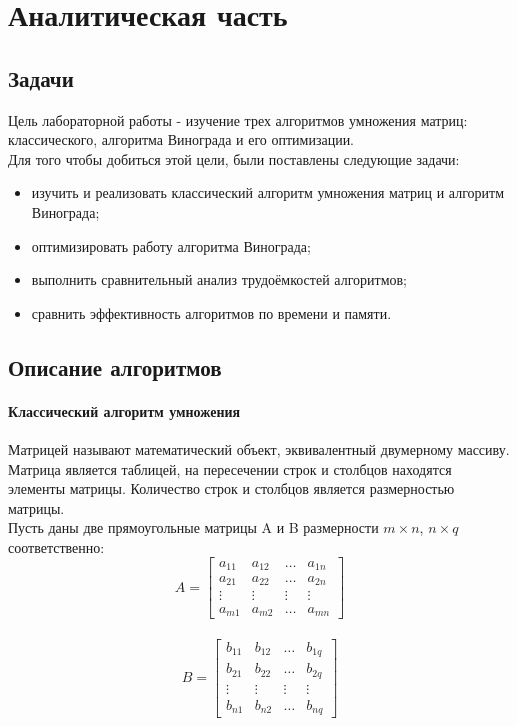 \documentclass[12pt, a4paper]{report}
\begin{document}
    \chapter{Аналитическая часть}
	\section{Задачи}
	Цель лабораторной работы - изучение трех алгоритмов умножения матриц: классического, алгоритма Винограда и его оптимизации.\\
	Для того чтобы добиться этой цели, были поставлены следующие задачи:\\
	\begin{itemize}
		\item изучить и реализовать классический алгоритм умножения матриц и алгоритм Винограда;
		\item оптимизировать работу алгоритма Винограда;
		\item выполнить сравнительный анализ трудоёмкостей алгоритмов;
		\item сравнить эффективность алгоритмов по времени и памяти.
	\end{itemize}

	\section{Описание алгоритмов}
	\subsubsection{Классический алгоритм умножения}
	Матрицей называют математический объект, эквивалентный двумерному массиву. Матрица является таблицей, на пересечении строк и столбцов находятся элементы матрицы. Количество строк и столбцов является размерностью матрицы.\\
	Пусть даны две прямоугольные матрицы A и B размерности $m \times n$, $n \times q$
	соответственно:\\
	
	$$A =  \begin{bmatrix} 
	a_{11}& a_{12} &\ldots & a_{1n}\\ 
	a_{21}& a_{22} &\ldots & a_{2n}\\ 
	\vdots& \vdots &\vdots & \vdots\\ 
	a_{m1}& a_{m2} &\ldots & a_{mn} 
	\end{bmatrix} $$\\	
	
	$$B = \begin{bmatrix} 
	b_{11}& b_{12} &\ldots & b_{1q}\\ 
	b_{21}& b_{22} &\ldots & b_{2q}\\ 
	\vdots& \vdots &\vdots & \vdots\\ 
	b_{n1}& b_{n2} &\ldots & b_{nq} 
	\end{bmatrix} $$\\
	
\end{document}
